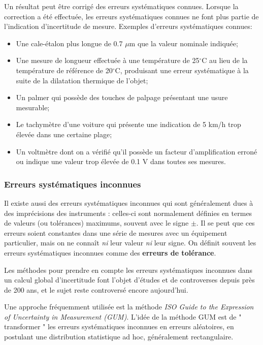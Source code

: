 Un résultat peut être corrigé des erreurs systématiques connues. Lorsque la correction a été effectuée, les erreurs systématiques connues ne font plus partie de l'indication d'incertitude de mesure. Exemples d'erreurs systématiques connues:
\begin{itemize}

    \item Une cale-étalon plus longue de 0.7 $\mu$m que la valeur nominale indiquée;
    \item Une mesure de longueur effectuée à une température de 25$^{\circ}$C au lieu de la température de référence de 20$^{\circ}$C, produisant une erreur systématique à la suite de la dilatation thermique de l'objet;
    \item Un palmer qui possède des touches de palpage présentant une usure mesurable;
    \item Le tachymètre d'une voiture qui présente une indication de 5 km/h trop élevée dans une certaine plage;
    \item Un voltmètre dont on a vérifié qu'il possède un facteur d'amplification erroné ou indique une valeur trop élevée de 0.1 V dans toutes ses mesures.
\end{itemize}

\subsubsection{Erreurs systématiques inconnues}

Il existe aussi des erreurs systématiques inconnues qui sont généralement dues à des imprécisions des instruments : celles-ci sont normalement définies en termes de valeurs (ou tolérances) maximums, souvent avec le signe $\pm$. Il se peut que ces erreurs soient constantes dans une série de mesures avec un équipement particulier, mais on ne connaît \textit{ni} leur valeur \textit{ni} leur signe. On définit souvent les erreurs systématiques inconnues comme des \textbf{erreurs de tolérance}.

Les méthodes pour prendre en compte les erreurs systématiques inconnues dans un calcul global d'incertitude font l'objet d'études et de controverses depuis près de 200 ans, et le sujet reste controversé encore aujourd'hui.

Une approche fréquemment utilisée est la méthode \textit{ISO Guide to the Expression of Uncertainty in Measurement (GUM)}. L'idée de la méthode GUM est de " transformer " les erreurs systématiques inconnues en erreurs aléatoires, en postulant une distribution statistique ad hoc, généralement rectangulaire.

